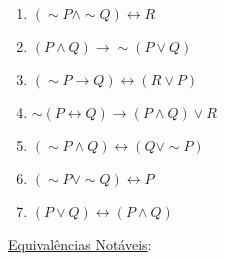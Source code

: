 \documentclass[12pt, a4paper,final]{article}
\begin{document}
\begin{enumerate}
\begin{enumerate}[label=(\alph*)]
            \item $(\sim P \wedge \sim Q) \leftrightarrow R$ %
            
            \item $(P \wedge Q) \rightarrow \sim (P \vee Q)$ %
            
            \item $(\sim P \rightarrow Q) \leftrightarrow (R \vee P)$ %
            
            \item $\sim(P \leftrightarrow Q) \rightarrow (P \wedge Q) \vee R$ %
            
            \item $(\sim P \wedge Q) \leftrightarrow (Q \vee \sim P)$
            
            \item $(\sim P \vee \sim Q) \leftrightarrow P$ %
            
            \item $(P \vee Q) \leftrightarrow (P \wedge Q)$ %
        \end{enumerate}
        
        
        
    \end{enumerate}




    \newpage %
    
    
    
    
    \underline{{\Large Equivalências Notáveis}}:
    
\end{document}
